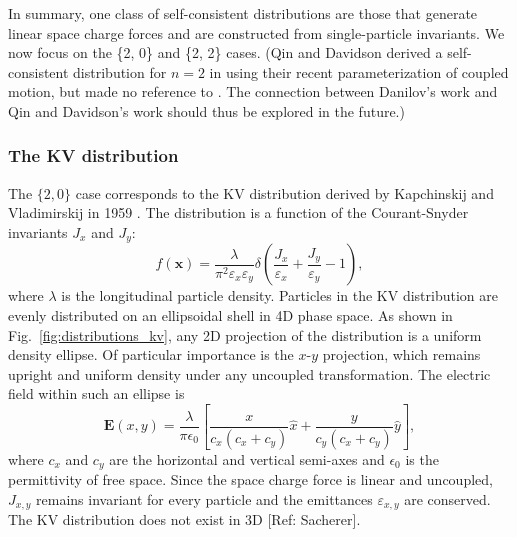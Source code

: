 In summary, one class of self-consistent distributions are those that generate linear space charge forces and are constructed from single-particle invariants. We now focus on the \{2, 0\} and \{2, 2\} cases. (Qin and Davidson derived a self-consistent distribution for $n = 2$ in \cite{Qin2013} using their recent parameterization of coupled motion, but made no reference to \cite{Danilov2003}. The connection between Danilov's work and Qin and Davidson's work should thus be explored in the future.)



\subsubsection{The KV distribution}

The $\{2, 0\}$ case corresponds to the KV distribution derived by Kapchinskij and Vladimirskij in 1959 \cite{Kapchinskij1959}. The distribution is a function of the Courant-Snyder invariants $J_x$ and $J_y$:
%
\begin{equation}
    f(\mathbf{x}) = \frac{\lambda}{\pi^2 \varepsilon_x\varepsilon_y}
    \delta \left(\frac{J_x}{\varepsilon_x} + \frac{J_y}{\varepsilon_y} -1 \right),
\end{equation}
%
where $\lambda$ is the longitudinal particle density. Particles in the KV distribution are evenly distributed on an ellipsoidal shell in 4D phase space. As shown in Fig.~\ref{fig:distributions_kv}, any 2D projection of the distribution is a uniform density ellipse. Of particular importance is the $x$-$y$ projection, which remains upright and uniform density under any uncoupled transformation. The electric field within such an ellipse is
%
\begin{equation}  \label{eq:field_in_upright_ellipse}
    \mathbf{E}(x, y) =
    \frac{\lambda}{\pi\epsilon_0}
    \left[ 
        \frac{x}{c_x\left(c_x+c_y\right)} \hat{x}
        + \frac{y}{c_y\left(c_x+c_y\right)} \hat{y}
    \right],
\end{equation}
%
where $c_x$ and $c_y$ are the horizontal and vertical semi-axes and $\epsilon_0$ is the permittivity of free space. Since the space charge force is linear and uncoupled, $J_{x,y}$ remains invariant for every particle and the emittances $\varepsilon_{x,y}$ are conserved. The KV distribution does not exist in 3D [Ref: Sacherer].

